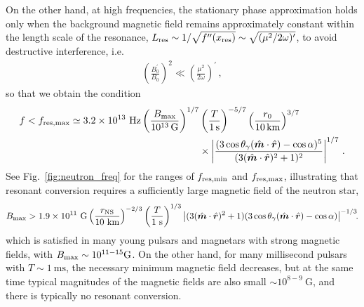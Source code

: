 \documentclass[a4paper,11pt]{article}
\begin{document}
On the other hand, at high frequencies, the stationary phase approximation holds only when the background magnetic field remains approximately constant within the length scale of the resonance, $ L_{\rm res} \sim 1 / \sqrt{ f^{\prime\prime}(x_{\rm res})  } \sim \sqrt{ (\mu^{2}/2\omega)^{\prime} }$,
to avoid destructive interference, i.e.
%
\begin{align}
    \left( \frac{B_{0}^{\prime}}{B_{0}} \right)^{2} \ll \left( \frac{ \mu^{2} }{2 \omega} \right)^{\prime} \, ,
\end{align}
%
so that we obtain the condition
%
\begin{equation}
    \begin{aligned}
    \label{eq:f_max}
    f < f_{\rm res,max} \simeq  3.2 \times 10^{13} ~\text{Hz}   \left( 
    \frac{B_{\rm max}}{10^{13} \, \text{G}} \right)^{1/7} & \left( \frac{T}{1 \, \text{s}} \right)^{-5/7} \left( \frac{r_{0}}{10\,\text{km}} \right)^{3/7}  \\
    & \times \left\vert \frac{ ( 3 \cos \theta_{\gamma} (\hat{\bm{m}} \cdot \hat{\bm{r}}) - \cos \alpha )^{5} }{ (3 ( \hat{\bm{m}} \cdot \hat{\bm{r}} )^{2} + 1  )^{2}} \right\vert^{1/7}  \,.
    \end{aligned}
\end{equation}
%
See Fig.~\ref{fig:neutron_freq} for the ranges of $f_{\rm res,min}$ and $ f_{\rm res,max} $, 
illustrating that resonant conversion requires a sufficiently large magnetic field of the neutron star,
\begin{align}
    B_{\rm max} > 1.9 \times 10^{11} ~\text{G} \left( \frac{r_{\rm NS}}{10~\text{km}} \right)^{-2/3} \left(  \frac{T}{1~\text{s}} \right)^{1/3}  \left\vert  (3 ( \hat{\bm{m}} \cdot \hat{\bm{r}} )^{2} + 1  ) ( 3 \cos \theta_{\gamma} (\hat{\bm{m}} \cdot \hat{\bm{r}}) - \cos \alpha )  \right\vert^{-1/3} \!\!.
    \label{eq:Bthreshold}
\end{align}
%
which is satisfied in many young pulsars and magnetars with strong magnetic fields, with $ B_{\rm max} \sim 10^{11-15} \text{G} $. On the other hand, for many millisecond pulsars with $ T \sim 1~\text{ms}$, the necessary minimum magnetic field decreases, but at the same time typical magnitudes of the magnetic fields are also small $ \sim 10^{8-9}~\text{G}$, and there is typically no resonant conversion.
\end{document}

